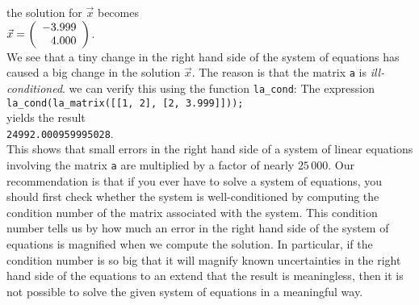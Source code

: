 the solution for $\vec{x}$ becomes
\\[0.2cm]
\hspace*{1.3cm}
$\vec{x}  = 
 \left(
   \begin{array}[c]{r}
     -3.999 \\ 4.000
   \end{array}
  \right)
$.
\\[0.2cm]
We see that a tiny change in the right hand side of the system of equations has caused a big change
in the solution $\vec{x}$.  The reason is that the matrix \texttt{a} is \emph{ill-conditioned}.
we can verify this using the function \texttt{la\_cond}:  The expression
\\[0.2cm]
\hspace*{1.3cm}
\texttt{la\_cond(la\_matrix([[1, 2], [2, 3.999]]));}
\\[0.2cm]
yields the result 
\\[0.2cm]
\hspace*{1.3cm}
\texttt{24992.000959995028}.
\\[0.2cm]
This shows that small errors in the right hand side of a system of linear equations involving the
matrix \texttt{a} are multiplied by a factor of nearly $25\,000$.  Our recommendation is that if you
ever have to solve a system of equations, you should first check whether the system is
well-conditioned by computing the condition number of the matrix associated with the system.  This 
condition number tells us by how much an error in the right hand side of the system of equations is
magnified when we compute the solution.  In particular, if the condition number is so big that it
will magnify known uncertainties in  the right hand side of the equations to an extend that the
result is meaningless, then it is not possible to solve the given system of equations in a
meaningful way. 


